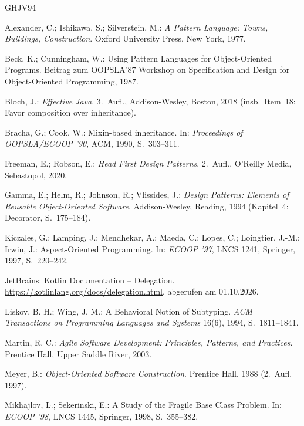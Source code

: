 \documentclass[a4paper,11pt,toc=listof,toc=bibliography]{scrartcl}
\begin{document}
\clearpage
\begin{thebibliography}{GHJV94}
\setlength{\itemsep}{4pt}

Alexander, C.; Ishikawa, S.; Silverstein, M.: \emph{A Pattern Language: Towns, Buildings, Construction}. Oxford University Press, New York, 1977.

Beck, K.; Cunningham, W.: Using Pattern Languages for Object-Oriented Programs. Beitrag zum OOPSLA'87 Workshop on Specification and Design for Object-Oriented Programming, 1987.

Bloch, J.: \emph{Effective Java}. 3.\ Aufl., Addison-Wesley, Boston, 2018 (insb.\ Item~18: Favor composition over inheritance).

Bracha, G.; Cook, W.: Mixin-based inheritance. In: \emph{Proceedings of OOPSLA/ECOOP '90}, ACM, 1990, S.~303--311.

Freeman, E.; Robson, E.: \emph{Head First Design Patterns}. 2.\ Aufl., O'Reilly Media, Sebastopol, 2020.

Gamma, E.; Helm, R.; Johnson, R.; Vlissides, J.: \emph{Design Patterns: Elements of Reusable Object-Oriented Software}. Addison-Wesley, Reading, 1994 (Kapitel~4: Decorator, S.~175--184).

Kiczales, G.; Lamping, J.; Mendhekar, A.; Maeda, C.; Lopes, C.; Loingtier, J.-M.; Irwin, J.: Aspect-Oriented Programming. In: \emph{ECOOP '97}, LNCS 1241, Springer, 1997, S.~220--242.

JetBrains: Kotlin Documentation -- Delegation. \url{https://kotlinlang.org/docs/delegation.html}, abgerufen am 01.10.2026.

Liskov, B. H.; Wing, J. M.: A Behavioral Notion of Subtyping. \emph{ACM Transactions on Programming Languages and Systems} 16(6), 1994, S.~1811--1841.

Martin, R. C.: \emph{Agile Software Development: Principles, Patterns, and Practices}. Prentice Hall, Upper Saddle River, 2003.

Meyer, B.: \emph{Object-Oriented Software Construction}. Prentice Hall, 1988 (2.\ Aufl. 1997).

Mikhajlov, L.; Sekerinski, E.: A Study of the Fragile Base Class Problem. In: \emph{ECOOP '98}, LNCS 1445, Springer, 1998, S.~355--382.


\end{thebibliography}
\end{document}

